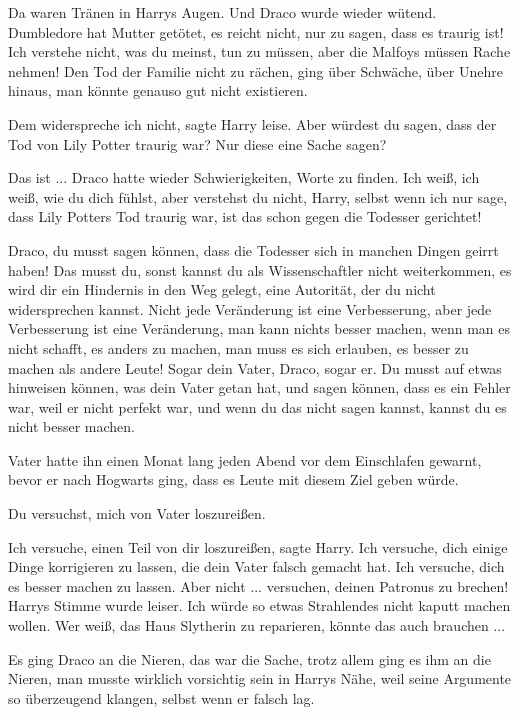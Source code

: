 Da waren Tränen in Harrys Augen. Und Draco wurde wieder wütend. \glqq{}Dumbledore
hat Mutter getötet, es reicht nicht, nur zu sagen, dass es traurig ist! Ich
verstehe nicht, was du meinst, tun zu müssen, aber die Malfoys müssen Rache
nehmen!\grqq{} Den Tod der Familie nicht zu rächen, ging über Schwäche, über
Unehre hinaus, man könnte genauso gut nicht existieren.

\glqq{}Dem widerspreche ich nicht\grqq{}, sagte Harry leise. \glqq{}Aber würdest
du sagen, dass der Tod von Lily Potter traurig war? Nur diese eine Sache
sagen?\grqq{}

\glqq{}Das ist ...\grqq{} Draco hatte wieder Schwierigkeiten, Worte zu finden.
\glqq{}Ich weiß, ich weiß, wie du dich fühlst, aber verstehst du nicht, Harry,
selbst wenn ich nur sage, dass Lily Potters Tod traurig war, ist das schon gegen
die Todesser gerichtet!\grqq{}

\glqq{}Draco, du musst sagen können, dass die Todesser sich in manchen Dingen
geirrt haben! Das musst du, sonst kannst du als Wissenschaftler nicht
weiterkommen, es wird dir ein Hindernis in den Weg gelegt, eine Autorität, der
du nicht widersprechen kannst. Nicht jede Veränderung ist eine Verbesserung,
aber jede Verbesserung ist eine Veränderung, man kann nichts besser machen, wenn
man es nicht schafft, es anders zu machen, man muss es sich erlauben, es besser
zu machen als andere Leute! Sogar dein Vater, Draco, sogar er. Du musst auf
etwas hinweisen können, was dein Vater getan hat, und sagen können, dass es ein
Fehler war, weil er nicht perfekt war, und wenn du das nicht sagen kannst,
kannst du es nicht besser machen.\grqq{}

Vater hatte ihn einen Monat lang jeden Abend vor dem Einschlafen gewarnt, bevor
er nach Hogwarts ging, dass es Leute mit diesem Ziel geben würde.

\glqq{}Du versuchst, mich von Vater loszureißen.\grqq{}

\glqq{}Ich versuche, einen Teil von dir loszureißen\grqq{}, sagte Harry. \glqq{}
Ich versuche, dich einige Dinge korrigieren zu lassen, die dein Vater falsch
gemacht hat. Ich versuche, dich es besser machen zu lassen. Aber nicht ...
versuchen, deinen Patronus zu brechen!\grqq{} Harrys Stimme wurde leiser. \glqq{}
Ich würde so etwas Strahlendes nicht kaputt machen wollen. Wer weiß, das Haus
Slytherin zu reparieren, könnte das auch brauchen ...\grqq{}

Es ging Draco an die Nieren, das war die Sache, trotz allem ging es ihm an die
Nieren, man musste wirklich vorsichtig sein in Harrys Nähe, weil seine Argumente
so überzeugend klangen, selbst wenn er falsch lag.

